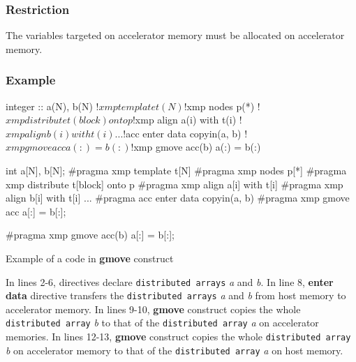 \subsubsection*{Restriction}
The variables targeted on accelerator memory must be allocated on accelerator memory.

\subsubsection*{Example}
\begin{myfigure}
\begin{minipage}{0.45\hsize}
\begin{center}
\begin{XACCFexampleL}
integer :: a(N), b(N)
!$xmp template t(N)
!$xmp nodes p(*)
!$xmp distribute t(block) onto p
!$xmp align a(i) with t(i)
!$xmp align b(i) with t(i)
...
!$acc enter data copyin(a, b)
!$xmp gmove acc
  a(:) = b(:)

!$xmp gmove acc(b)
  a(:) = b(:)
\end{XACCFexampleL}
\end{center}
\end{minipage}
%
\begin{minipage}{0.53\hsize}
\begin{center}
\begin{XACCCexampleR}
int a[N], b[N];
#pragma xmp template t[N]
#pragma xmp nodes p[*]
#pragma xmp distribute t[block] onto p
#pragma xmp align a[i] with t[i]
#pragma xmp align b[i] with t[i]
...
#pragma acc enter data copyin(a, b)
#pragma xmp gmove acc
  a[:] = b[:];

#pragma xmp gmove acc(b)
  a[:] = b[:];
\end{XACCCexampleR}
\end{center}
\end{minipage}
\caption{Example of a code in {\XACC} {\bf gmove} construct}\label{code:gmove}
\end{myfigure}

In lines 2-6,
{\XMP} directives declare {\tt distributed arrays} {\it a} and {\it b}.
In line 8,
{\OACC} {\bf enter data} directive transfers the {\tt distributed arrays} {\it a} and {\it b} from host memory to accelerator memory.
In lines 9-10,
{\XACC} {\bf gmove} construct copies the whole {\tt distributed array} {\it b} to
that of the {\tt distributed array} {\it a} on accelerator memories.
In lines 12-13,
{\XACC} {\bf gmove} construct copies the whole {\tt distributed array} {\it b} on accelerator memory to
that of the {\tt distributed array} {\it a} on host memory.

